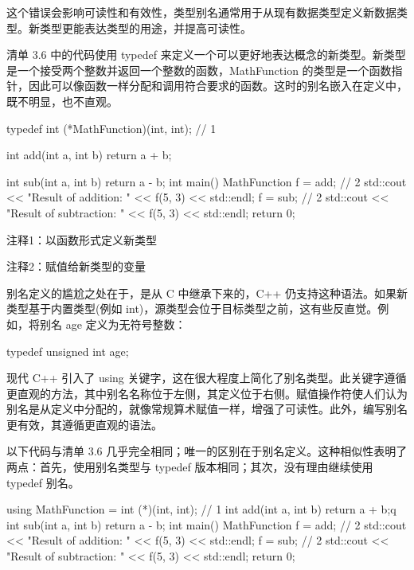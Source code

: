 
这个错误会影响可读性和有效性，类型别名通常用于从现有数据类型定义新数据类型。新类型更能表达类型的用途，并提高可读性。


清单 3.6 中的代码使用 typedef 来定义一个可以更好地表达概念的新类型。新类型是一个接受两个整数并返回一个整数的函数，MathFunction 的类型是一个函数指针，因此可以像函数一样分配和调用符合要求的函数。这时的别名嵌入在定义中，既不明显，也不直观。


\begin{cpp}
typedef int (*MathFunction)(int, int); // 1

int add(int a, int b) {
  return a + b;
}

int sub(int a, int b) {
  return a - b;
}
int main() {
  MathFunction f = add; // 2
  std::cout << "Result of addition: " << f(5, 3) << std::endl;
  f = sub; // 2
  std::cout << "Result of subtraction: " << f(5, 3) << std::endl;
  return 0;
}
\end{cpp}

{\footnotesize
注释1：以函数形式定义新类型

注释2：赋值给新类型的变量
}


别名定义的尴尬之处在于，是从 C 中继承下来的，C++ 仍支持这种语法。如果新类型基于内置类型(例如 int)，源类型会位于目标类型之前，这有些反直觉。例如，将别名 age 定义为无符号整数：

\begin{cpp}
typedef unsigned int age;
\end{cpp}


现代 C++ 引入了 using 关键字，这在很大程度上简化了别名类型。此关键字遵循更直观的方法，其中别名名称位于左侧，其定义位于右侧。赋值操作符使人们认为别名是从定义中分配的，就像常规算术赋值一样，增强了可读性。此外，编写别名更有效，其遵循更直观的语法。

以下代码与清单 3.6 几乎完全相同；唯一的区别在于别名定义。这种相似性表明了两点：首先，使用别名类型与 typedef 版本相同；其次，没有理由继续使用 typedef 别名。


\begin{cpp}
using MathFunction = int (*)(int, int); // 1
int add(int a, int b) {
  return a + b;q
  }
  int sub(int a, int b) {
  return a - b;
}
int main() {
  MathFunction f = add; // 2
  std::cout << "Result of addition: " << f(5, 3) << std::endl;
  f = sub; // 2
  std::cout << "Result of subtraction: " << f(5, 3) << std::endl;
  return 0;
}
\end{cpp}

